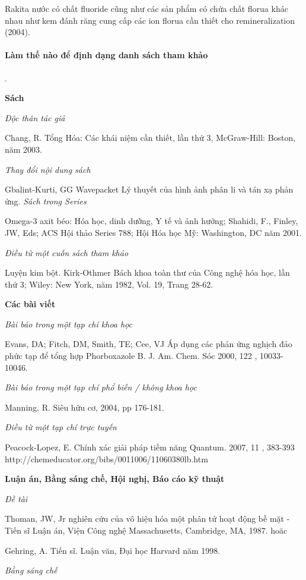 \documentclass{hcmutarticle}
\begin{document}
Rakita nước có chất fluoride cũng như các sản phẩm có chứa chất florua khác nhau như kem đánh răng cung cấp các ion florua cần thiết cho remineralization (2004).

\paragraph{Làm thế nào để định dạng danh sách tham khảo}.

{\bfseries Sách}

{\em Độc thân tác giả}

Chang, R. Tổng Hóa: Các khái niệm cần thiết, lần thứ 3, McGraw-Hill: Boston, năm 2003.

{\em Thay đổi nội dung sách}

Gbalint-Kurti, GG Wavepacket Lý thuyết của hình ảnh phân li và tán xạ phản ứng. 
{\em Sách trong Series}

Omega-3 axit béo: Hóa học, dinh dưỡng, Y tế và ảnh hưởng; Shahidi, F., Finley, JW, Eds; ACS Hội thảo Series 788; Hội Hóa học Mỹ: Washington, DC năm 2001.

{\em Điều từ một cuốn sách tham khảo}

Luyện kim bột. Kirk-Othmer Bách khoa toàn thư của Công nghệ hóa học, lần thứ 3; Wiley: New York, năm 1982, Vol. 19, Trang 28-62.

{\bfseries Các bài viết}

{\em Bài báo trong một tạp chí khoa học}

Evans, DA; Fitch, DM, Smith, TE; Cee, VJ Áp dụng các phản ứng nghịch đảo phức tạp để tổng hợp Phorboxazole B. J. Am. Chem. Sóc 2000, 122 , 10033-10046.

{\em Bài báo trong một tạp chí phổ biến / không khoa học}

Manning, R. Siêu hữu cơ, 2004, pp 176-181.

{\em Điều từ một tạp chí trực tuyến}

Peacock-Lopez, E. Chính xác giải pháp tiềm năng Quantum. 2007, 11 , 383-393 http://chemeducator.org/bibs/0011006/11060380lb.htm 

{\bfseries Luận án, Bằng sáng chế, Hội nghị, Báo cáo kỹ thuật}

{\em Đề tài}

Thoman, JW, Jr nghiên cứu của vô hiệu hóa một phân tử hoạt động bề mặt -Tiến sĩ Luận án, Viện Công nghệ Massachusetts, Cambridge, MA, 1987.
hoăc

Gehring, A. Tiến sĩ. Luận văn, Đại học Harvard năm 1998.

{\em Bằng sáng chế}
\end{document}
